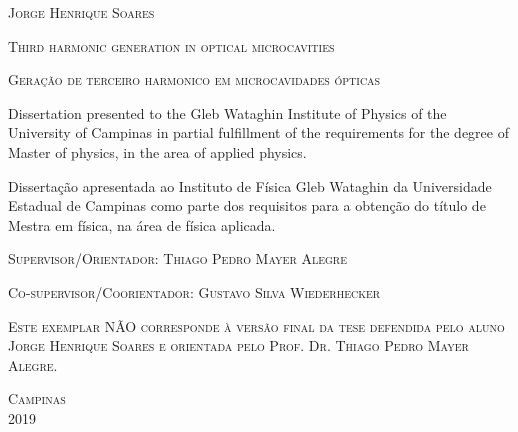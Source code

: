 \newpage
\thispagestyle{empty}

\vspace*{0.6cm}
\begin{center}
\textsc{\large Jorge Henrique Soares}
\end{center}


\vspace*{0.6cm}

\begin{center}
\textsc{\Large Third harmonic generation in optical microcavities}
\end{center}

\vspace*{0.3cm}

\begin{center}
\textsc{\large Geração de terceiro harmonico em microcavidades ópticas}
\end{center}

\vspace*{0.6cm}

\begin{flushright}
\begin{minipage}{8.0cm}
Dissertation presented to the Gleb Wataghin Institute of Physics of the University of Campinas in partial fulfillment of the requirements for the degree of Master of physics, in the area of applied physics.

\vspace*{0.3cm}

Dissertação apresentada ao Instituto de Física Gleb Wataghin da Universidade Estadual de Campinas como parte dos requisitos para a obtenção do título de Mestra em física, na área de física aplicada.

\end{minipage}
\end{flushright}

\vspace*{0.8cm}
\begin{flushleft}
	\hspace{0.3cm} \textsc{Supervisor/Orientador: Thiago Pedro Mayer Alegre}
	
	\hspace{0.3cm} \textsc{Co-supervisor/Coorientador: Gustavo Silva Wiederhecker}
\end{flushleft}

\vspace*{0.5cm}

\begin{minipage}{7cm}
\scriptsize \textsc{Este exemplar NÃO corresponde à versão final da tese defendida pelo aluno Jorge Henrique Soares e orientada pelo Prof. Dr. Thiago Pedro Mayer Alegre.}
\end{minipage}

\vspace*{0.5cm}

\null \vfill
\begin{center}
\textsc{\large Campinas\\2019}
\end{center}




